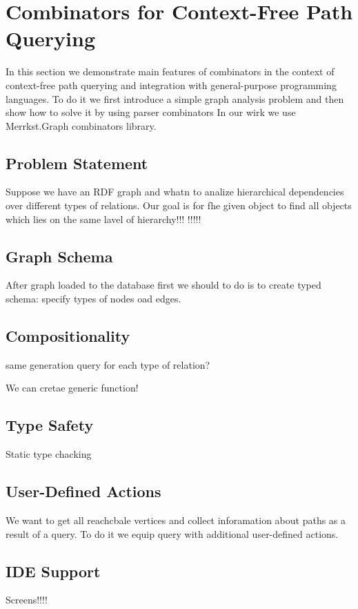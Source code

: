 \section{Combinators for Context-Free Path Querying}

In this section we demonstrate main features of combinators in the context of context-free path querying and integration with general-purpose programming languages.
To do it we first introduce a simple graph analysis problem and then show how to solve it by using parser combinators
In our wirk we use Merrkst.Graph combinators library.

\subsection{Problem Statement}
Suppose we have an RDF graph and whatn to analize hierarchical dependencies over different types of relations.
Our goal is for fhe given object to find all objects which lies on the same lavel of hierarchy!!!
!!!!!

\subsection{Graph Schema}
After graph loaded to the database first we should to do is to create typed schema: specify types of nodes oad edges.

\subsection{Compositionality}

same generation query for each type of relation?

We can cretae generic function!

\subsection{Type Safety}

Static type chacking

\subsection{User-Defined Actions}

We want to get all reachcbale vertices and collect inforamation about paths as a result of a query.
To do it we equip query with additional user-defined actions.

\subsection{IDE Support}

Screens!!!!
